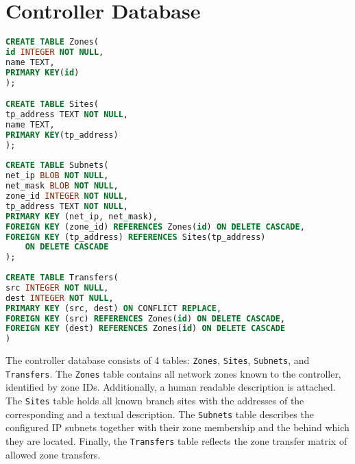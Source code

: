 \chapter{Controller Database}
\label{apdx:controllerdb}


\begin{lstlisting}[language=sql, basicstyle=\footnotesize,
]
CREATE TABLE Zones(
id INTEGER NOT NULL,
name TEXT,
PRIMARY KEY(id)
);

CREATE TABLE Sites(
tp_address TEXT NOT NULL,
name TEXT,
PRIMARY KEY(tp_address)
);
	  
CREATE TABLE Subnets(
net_ip BLOB NOT NULL,
net_mask BLOB NOT NULL,
zone_id INTEGER NOT NULL,
tp_address TEXT NOT NULL,
PRIMARY KEY (net_ip, net_mask),
FOREIGN KEY (zone_id) REFERENCES Zones(id) ON DELETE CASCADE,
FOREIGN KEY (tp_address) REFERENCES Sites(tp_address)
	ON DELETE CASCADE
);
	  
CREATE TABLE Transfers(
src INTEGER NOT NULL,
dest INTEGER NOT NULL,
PRIMARY KEY (src, dest) ON CONFLICT REPLACE,
FOREIGN KEY (src) REFERENCES Zones(id) ON DELETE CASCADE,
FOREIGN KEY (dest) REFERENCES Zones(id) ON DELETE CASCADE	
)
\end{lstlisting}

The controller database consists of 4 tables: \texttt{Zones}, \texttt{Sites}, \texttt{Subnets},
and \texttt{Transfers}. The \texttt{Zones} table contains all network zones known to the
controller, identified by zone IDs. Additionally, a human readable description is attached. The
\texttt{Sites} table holds all known branch sites with the addresses of the corresponding \tps
and a textual description. The \texttt{Subnets} table describes the configured IP subnets
together with their zone membership and the \tp behind which they are located. Finally, the
\texttt{Transfers} table reflects the zone transfer matrix of allowed zone transfers.
